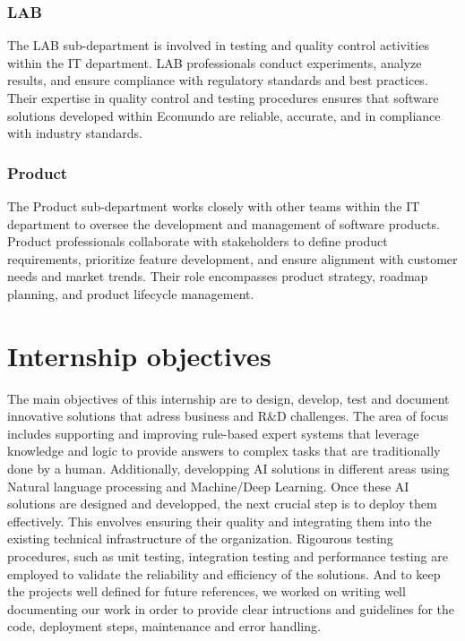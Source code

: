 \documentclass[a4paper,12pt,twoside]{report}
\begin{document}
\subsubsection{LAB}

The LAB sub-department is involved in testing and quality control activities within the IT department. LAB professionals conduct experiments, analyze results, and ensure compliance with regulatory standards and best practices. Their expertise in quality control and testing procedures ensures that software solutions developed within Ecomundo are reliable, accurate, and in compliance with industry standards.

\subsubsection{Product}

The Product sub-department works closely with other teams within the IT department to oversee the development and management of software products. Product professionals collaborate with stakeholders to define product requirements, prioritize feature development, and ensure alignment with customer needs and market trends. Their role encompasses product strategy, roadmap planning, and product lifecycle management.


\section{Internship objectives}

The main objectives of this internship are to design, develop, test and document innovative solutions that adress business and R\&D challenges. The area of focus includes supporting and improving rule-based expert systems that leverage knowledge and logic to provide answers to complex tasks that are traditionally done by a human. Additionally, developping AI solutions in different areas using Natural language processing and Machine/Deep Learning. Once these AI solutions are designed and developped, the next crucial step is to deploy them effectively. This envolves ensuring their quality and integrating them into the existing technical infrastructure of the organization. Rigourous testing procedures, such as unit testing, integration testing and performance testing are employed to validate the reliability and efficiency of the solutions. And to keep the projects well defined for future references, we worked on writing well documenting our work in order to provide clear intructions and guidelines for the code, deployment steps, maintenance and error handling.
\end{document}
